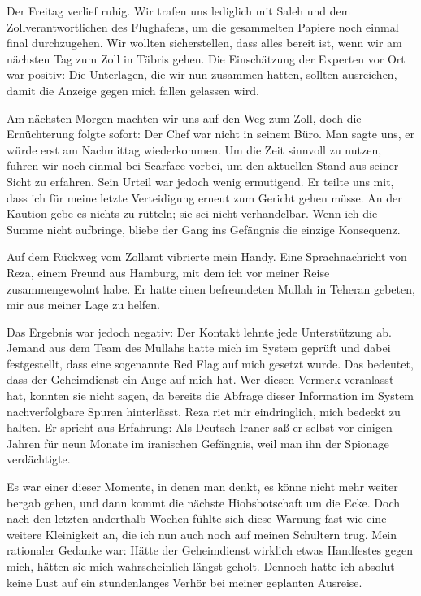 Der Freitag verlief ruhig. Wir trafen uns lediglich mit Saleh und dem Zollverantwortlichen des Flughafens, um die gesammelten Papiere noch einmal final durchzugehen. Wir wollten sicherstellen, dass alles bereit ist, wenn wir am nächsten Tag zum Zoll in Täbris gehen. Die Einschätzung der Experten vor Ort war positiv: Die Unterlagen, die wir nun zusammen hatten, sollten ausreichen, damit die Anzeige gegen mich fallen gelassen wird.

Am nächsten Morgen machten wir uns auf den Weg zum Zoll, doch die Ernüchterung folgte sofort: Der Chef war nicht in seinem Büro. Man sagte uns, er würde erst am Nachmittag wiederkommen. Um die Zeit sinnvoll zu nutzen, fuhren wir noch einmal bei Scarface vorbei, um den aktuellen Stand aus seiner Sicht zu erfahren. Sein Urteil war jedoch wenig ermutigend. Er teilte uns mit, dass ich für meine letzte Verteidigung erneut zum Gericht gehen müsse. An der Kaution gebe es nichts zu rütteln; sie sei nicht verhandelbar. Wenn ich die Summe nicht aufbringe, bliebe der Gang ins Gefängnis die einzige Konsequenz.

Auf dem Rückweg vom Zollamt vibrierte mein Handy. Eine Sprachnachricht von Reza, einem Freund aus Hamburg, mit dem ich vor meiner Reise zusammengewohnt habe. Er hatte einen befreundeten Mullah in Teheran gebeten, mir aus meiner Lage zu helfen.

Das Ergebnis war jedoch negativ: Der Kontakt lehnte jede Unterstützung ab. Jemand aus dem Team des Mullahs hatte mich im System geprüft und dabei festgestellt, dass eine sogenannte Red Flag auf mich gesetzt wurde. Das bedeutet, dass der Geheimdienst ein Auge auf mich hat. Wer diesen Vermerk veranlasst hat, konnten sie nicht sagen, da bereits die Abfrage dieser Information im System nachverfolgbare Spuren hinterlässt. Reza riet mir eindringlich, mich bedeckt zu halten. Er spricht aus Erfahrung: Als Deutsch-Iraner saß er selbst vor einigen Jahren für neun Monate im iranischen Gefängnis, weil man ihn der Spionage verdächtigte.

Es war einer dieser Momente, in denen man denkt, es könne nicht mehr weiter bergab gehen, und dann kommt die nächste Hiobsbotschaft um die Ecke. Doch nach den letzten anderthalb Wochen fühlte sich diese Warnung fast wie eine weitere Kleinigkeit an, die ich nun auch noch auf meinen Schultern trug. Mein rationaler Gedanke war: Hätte der Geheimdienst wirklich etwas Handfestes gegen mich, hätten sie mich wahrscheinlich längst geholt. Dennoch hatte ich absolut keine Lust auf ein stundenlanges Verhör bei meiner geplanten Ausreise.

